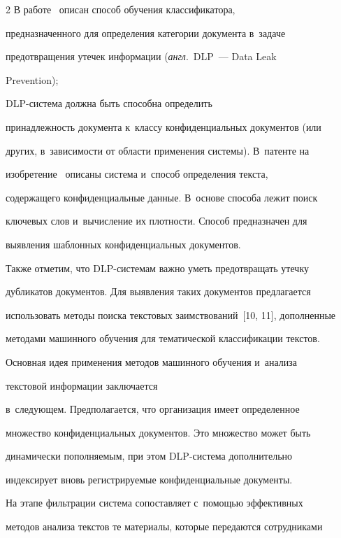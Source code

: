 \begin{multicols}{2}
  В работе~\cite{8-bs} описан способ обучения классификатора, 


предназначенного для определения категории документа в~задаче 


предотвращения утечек информации (\textit{англ}.\ DLP~--- Data Leak 


Prevention);\linebreak


 DLP-сис\-те\-ма должна быть способна определить 


принадлежность документа к~классу конфиденциальных документов (или 


других, в~зависимости от об\-ласти применения сис\-те\-мы). В~патенте на 


изоб\-ре\-те\-ние~\cite{9-bs} описаны система и~способ определения текста, 


содержащего конфиденциальные данные. В~основе способа лежит поиск 


ключевых слов и~вычисление их плотности. Способ предназначен для 


выявления шаблонных конфиденциальных документов.


  


  Также отметим, что DLP-системам важно уметь предотвращать утечку 


дубликатов документов. Для выявления таких документов предлагается 


использовать методы поиска текстовых заимствований~[10, 11], дополненные 


методами машинного обучения для тематической классификации текс\-тов.


   


  Основная идея применения методов ма\-шин\-ного обучения и~анализа 


текстовой информации заключается  


в~сле\-ду\-ющем. Предполагается, что организация имеет определенное 


множество конфиденциальных документов. Это множество может быть 


динамически пополняемым, при этом DLP-сис\-те\-ма дополнительно 


индексирует вновь регистрируемые конфиденциальные документы.


  


  На этапе фильтрации система сопоставляет с~помощью эффективных 


методов анализа текстов те материалы, которые передаются сотрудниками 



\end{multicols}
